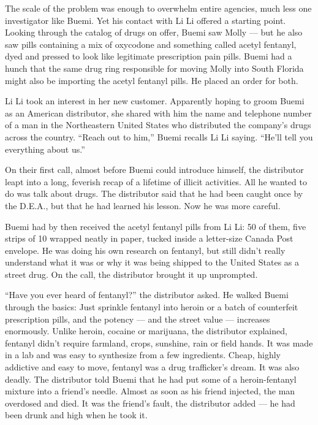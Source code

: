 The scale of the problem was enough to overwhelm entire agencies, much
less one investigator like Buemi. Yet his contact with Li Li offered a
starting point. Looking through the catalog of drugs on offer, Buemi saw
Molly --- but he also saw pills containing a mix of oxycodone and
something called acetyl fentanyl, dyed and pressed to look like
legitimate prescription pain pills. Buemi had a hunch that the same drug
ring responsible for moving Molly into South Florida might also be
importing the acetyl fentanyl pills. He placed an order for both.

Li Li took an interest in her new customer. Apparently hoping to groom
Buemi as an American distributor, she shared with him the name and
telephone number of a man in the Northeastern United States who
distributed the company's drugs across the country. ``Reach out to
him,'' Buemi recalls Li Li saying. ``He'll tell you everything about
us.''

On their first call, almost before Buemi could introduce himself, the
distributor leapt into a long, feverish recap of a lifetime of illicit
activities. All he wanted to do was talk about drugs. The distributor
said that he had been caught once by the D.E.A., but that he had learned
his lesson. Now he was more careful.

Buemi had by then received the acetyl fentanyl pills from Li Li: 50 of
them, five strips of 10 wrapped neatly in paper, tucked inside a
letter-size Canada Post envelope. He was doing his own research on
fentanyl, but still didn't really understand what it was or why it was
being shipped to the United States as a street drug. On the call, the
distributor brought it up unprompted.

``Have you ever heard of fentanyl?'' the distributor asked. He walked
Buemi through the basics: Just sprinkle fentanyl into heroin or a batch
of counterfeit prescription pills, and the potency --- and the street
value --- increases enormously. Unlike heroin, cocaine or marijuana, the
distributor explained, fentanyl didn't require farmland, crops,
sunshine, rain or field hands. It was made in a lab and was easy to
synthesize from a few ingredients. Cheap, highly addictive and easy to
move, fentanyl was a drug trafficker's dream. It was also deadly. The
distributor told Buemi that he had put some of a heroin-fentanyl mixture
into a friend's needle. Almost as soon as his friend injected, the man
overdosed and died. It was the friend's fault, the distributor added ---
he had been drunk and high when he took it.

